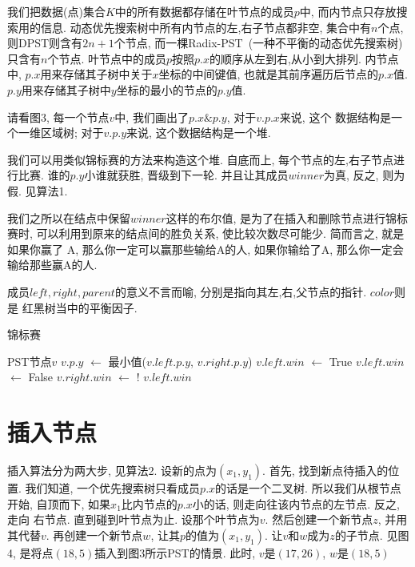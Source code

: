 \documentclass[a4paper]{article}
\begin{document}
我们把数据(点)集合$K$中的所有数据都存储在叶节点的成员$p$中, 
而内节点只存放搜索用的信息. 动态优先搜索树中所有内节点的左,右子节点都非空, 集合中有$n$个点, 
则DPST则含有$2n+1$个节点, 而一棵Radix-PST~\cite{Edward_04}(一种不平衡的动态优先搜索树)只含有$n$个节点. 
叶节点中的成员$p$按照$p.x$的顺序从左到右,从小到大排列. 
内节点中, $p.x$用来存储其子树中关于$x$坐标的中间键值, 也就是其前序遍历后节点的$p.x$值. 
$p.y$用来存储其子树中$y$坐标的最小的节点的$p.y$值. 

请看图3, 每一个节点$v$中, 我们画出了$p.x \& p.y$, 对于$v.p.x$来说, 这个
数据结构是一个一维区域树; 对于$v.p.y$来说, 这个数据结构是一个堆. 

我们可以用类似锦标赛的方法来构造这个堆. 自底而上, 每个节点的左,右子节点进行比赛.
谁的$p.y$小谁就获胜, 晋级到下一轮. 并且让其成员$winner$为真, 反之, 则为假. 见算法1.

我们之所以在结点中保留$winner$这样的布尔值, 是为了在插入和删除节点进行锦标赛时,
可以利用到原来的结点间的胜负关系, 使比较次数尽可能少. 简而言之, 就是如果你赢了
A, 那么你一定可以赢那些输给A的人, 如果你输给了A, 那么你一定会输给那些赢A的人. 

成员$left, right, parent$的意义不言而喻, 分别是指向其左,右,父节点的指针. $color$则是
红黑树当中的平衡因子. 

\begin{algorithm}[!h]
\caption{锦标赛} \label{alg:tournament}
	\begin{algorithmic}[1]
	\REQUIRE PST节点$v$
	\STATE $v.p.y$ $\leftarrow$ 最小值($v.left.p.y$, $v.right.p.y$)	
	\STATE $v.left.win$ $\leftarrow$ True
	\ELSE
	\STATE $v.left.win$ $\leftarrow$ False
	\ENDIF
	\STATE $v.right.win$ $\leftarrow$ ! $v.left.win$
	\end{algorithmic}
\end{algorithm}




\section{插入节点}

插入算法分为两大步, 见算法2. 设新的点为$(x_1,y_1)$. 首先, 找到新点待插入的位置.
我们知道, 一个优先搜索树只看成员$p.x$的话是一个二叉树. 所以我们从根节点开始,
自顶而下, 如果$x_1$比内节点的$p.x$小的话, 则走向往该内节点的左节点. 反之, 走向
右节点. 直到碰到叶节点为止. 设那个叶节点为$v$. 然后创建一个新节点$z$, 并用其代替$v$.
再创建一个新节点$w$, 让其$p$的值为$(x_1,y_1)$. 让$v$和$w$成为$z$的子节点. 
见图4, 是将点$(18,5)$插入到图3所示PST的情景. 此时, $v$是$(17, 26)$, $w$是$(18,5)$
\end{document}
